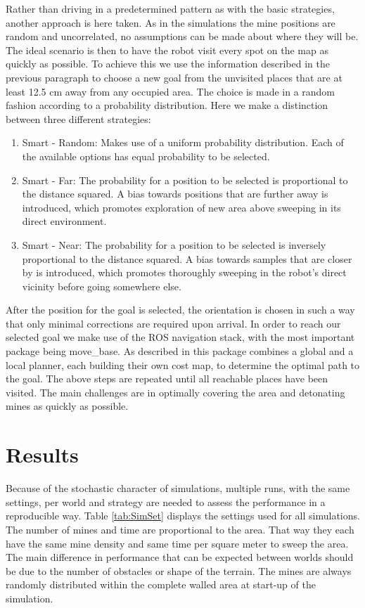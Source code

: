 \documentclass[conference]{IEEEtran}
\begin{document}
Rather than driving in a predetermined pattern as with the basic strategies, another approach is here taken. As in the simulations the mine positions are random and uncorrelated, no assumptions can be made about where they will be. The ideal scenario is then to have the robot visit every spot on the map as quickly as possible. To achieve this we use the information described in the previous paragraph to choose a new goal from the unvisited places that are at least 12.5 cm away from any occupied area. The choice is made in a random fashion according to a probability distribution. Here we make a distinction between three different strategies:
\begin{enumerate}
    \item Smart - Random: Makes use of a uniform probability distribution. Each of the available options has equal probability to be selected.
    \item Smart - Far: The probability for a position to be selected is proportional to the distance squared. A bias towards positions that are further away is introduced, which promotes exploration of new area above sweeping in its direct environment.
    \item Smart - Near: The probability for a position to be selected is inversely proportional to the distance squared. A bias towards samples that are closer by is introduced, which promotes thoroughly sweeping in the robot's direct vicinity before going somewhere else.
\end{enumerate}
After the position for the goal is selected, the orientation is chosen in such a way that only minimal corrections are required upon arrival. In order to reach our selected goal we make use of the ROS navigation stack, with the most important package being move\_base. As described in \cite{move_base} this package combines a global and a local planner, each building their own cost map, to determine the optimal path to the goal. The above steps are repeated until all reachable places have been visited. The main challenges are in optimally covering the area and detonating mines as quickly as possible.

\section{Results \label{sec:Results}}

Because of the stochastic character of simulations, multiple runs, with the same settings, per world and strategy are needed to assess the performance in a reproducible way. Table \ref{tab:SimSet} displays the settings used for all simulations. The number of mines and time are proportional to the area. That way they each have the same mine density and same time per square meter to sweep the area. The main difference in performance that can be expected between worlds should be due to the number of obstacles or shape of the terrain. The mines are always randomly distributed within the complete walled area at start-up of the simulation.
\end{document}
